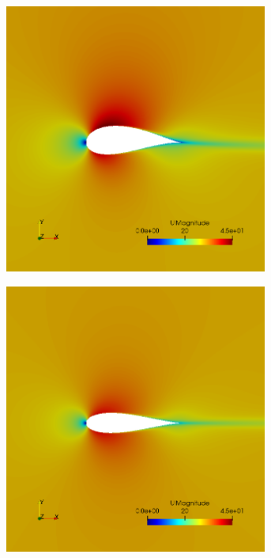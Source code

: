 \begin{figure}[h!]
    \centering
    \begin{subfigure}[t]{0.31\textwidth}
        \includegraphics[width=0.95\textwidth, height=0.17\textheight]{Figures/4/g0i116.png}
    \end{subfigure}
    \begin{subfigure}[t]{0.31\textwidth}
        \includegraphics[width=0.95\textwidth, height=0.17\textheight]{Figures/4/g0i19.png}

\end{subfigure}
\end{figure}
